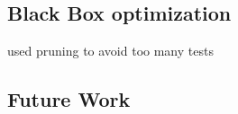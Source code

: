 \subsection{Black Box optimization}
used pruning to avoid too many tests

\subsection{Future Work}

